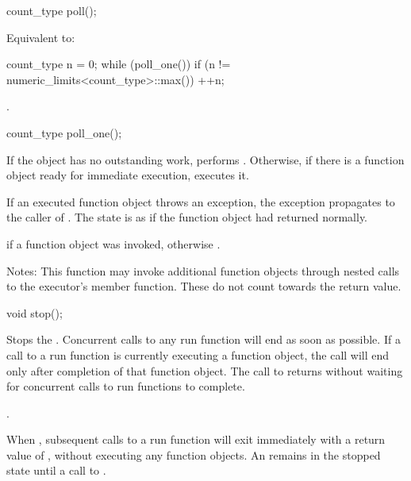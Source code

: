 \begin{itemdecl}
count_type poll();
\end{itemdecl}

\begin{itemdescr}
\pnum
\effects Equivalent to: 
\begin{codeblock}
count_type n = 0;
while (poll_one())
  if (n != numeric_limits<count_type>::max())
    ++n;
\end{codeblock}


\pnum
\returns {}.
\end{itemdescr}

\begin{itemdecl}
count_type poll_one();
\end{itemdecl}

\begin{itemdescr}
\pnum
\effects If the  object has no outstanding work, performs . Otherwise, if there is a function object ready for immediate execution, executes it.

\pnum
If an executed function object throws an exception, the exception propagates to the caller of . The  state is as if the function object had returned normally.

\pnum
\returns {} if a function object was invoked, otherwise .

\pnum
Notes: This function may invoke additional function objects through nested calls to the  executor's  member function. These do not count towards the return value.
\end{itemdescr}

\begin{itemdecl}
void stop();
\end{itemdecl}

\begin{itemdescr}
\pnum
\effects Stops the . Concurrent calls to any run function will end as soon as possible. If a call to a run function is currently executing a function object, the call will end only after completion of that function object. The call to  returns without waiting for concurrent calls to run functions to complete.

\pnum
\postconditions {}.

\pnum
\enternote When , subsequent calls to a run function will exit immediately with a return value of , without executing any function objects. An  remains in the stopped state until a call to . \exitnote
\end{itemdescr}

